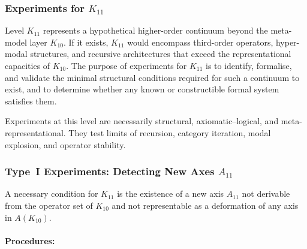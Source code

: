 
\subsubsection{Experiments for $K_{11}$}
\label{sec:experiments-k11}

Level $K_{11}$ represents a hypothetical higher-order continuum 
beyond the meta-model layer $K_{10}$.  
If it exists, $K_{11}$ would encompass third-order operators, 
hyper-modal structures, and recursive architectures that exceed the 
representational capacities of $K_{10}$.  
The purpose of experiments for $K_{11}$ is to identify, formalise, 
and validate the minimal structural conditions required for such a 
continuum to exist, and to determine whether any known or constructible 
formal system satisfies them.

Experiments at this level are necessarily structural, 
axiomatic–logical, and meta-representational.  
They test limits of recursion, category iteration, modal explosion, 
and operator stability.



\subsubsection{Type~I Experiments: Detecting New Axes $A_{11}$}

A necessary condition for $K_{11}$ is the existence of a new axis 
$A_{11}$ not derivable from the operator set of $K_{10}$ and not 
representable as a deformation of any axis in $A(K_{10})$.

\paragraph{Procedures:}

